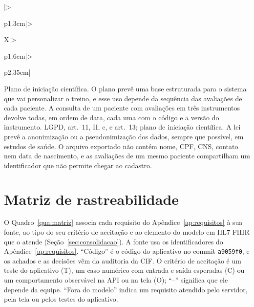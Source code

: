 \begin{apendicesenv}
{\begin{xltabular}{\textwidth}{|>{\raggedright\arraybackslash}p{1.3cm}|>{\raggedright\arraybackslash}X|>{\raggedright\arraybackslash}p{1.6cm}|>{\raggedright\arraybackslash}p{2.35cm}|}
		{Plano de iniciação científica.}
		{O plano prevê uma base estruturada para o sistema que vai personalizar o treino, e esse uso depende da
		sequência das avaliações de cada paciente.}
		{A consulta de um paciente com avaliações em três instrumentos devolve todas, em ordem de data, cada uma com o
		código e a versão do instrumento.}
		{LGPD, art.~11, II, c, e art.~13; plano de iniciação científica.}
		{A lei prevê a anonimização ou a pseudonimização dos dados, sempre que possível, em estudos de saúde.}
		{O arquivo exportado não contém nome, CPF, CNS, contato nem data de nascimento, e as avaliações de um mesmo
		paciente compartilham um identificador que não permite chegar ao cadastro.}
\end{xltabular}
}

\chapter{Matriz de rastreabilidade}
\label{ap:matriz}

O Quadro~\ref{qua:matriz} associa cada requisito do Apêndice~\ref{ap:requisitos} à sua fonte, ao tipo do seu critério
de aceitação e ao elemento do modelo em HL7 FHIR que o atende (Seção~\ref{sec:consolidacao}). A fonte usa os
identificadores do Apêndice~\ref{ap:requisitos}. ``Código'' é o código do aplicativo no commit \texttt{a9059f0}, e os
achados e as decisões vêm da auditoria da CIF. O critério de aceitação é um teste do aplicativo (T), um caso
numérico com entrada e saída esperadas (C) ou um comportamento observável na API ou na tela (O); ``--'' significa
que ele depende da equipe. ``Fora do modelo'' indica um requisito atendido pelo servidor, pela tela ou pelos testes
do aplicativo.

\newcommand{\mat}[4]{\textbf{#1} & #2 & #3 & #4 \\ \hline}


\end{apendicesenv}
